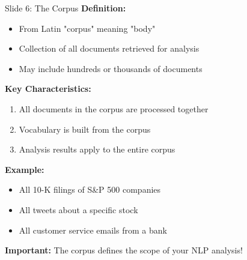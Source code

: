 \documentclass[8pt]{beamer}
\begin{document}
	\begin{frame}{Slide 6: The Corpus}
		\fontsize{6.5}{7.5}\selectfont
		\textbf{Definition:}
		\begin{itemize}
			\item From Latin "corpus" meaning "body"
			\item Collection of all documents retrieved for analysis
			\item May include hundreds or thousands of documents
		\end{itemize}
		
		\vspace{0.1cm}
		\textbf{Key Characteristics:}
		\begin{enumerate}
			\item All documents in the corpus are processed together
			\item Vocabulary is built from the corpus
			\item Analysis results apply to the entire corpus
		\end{enumerate}
		
		\vspace{0.1cm}
		\textbf{Example:}
		\begin{itemize}
			\item All 10-K filings of S\&P 500 companies
			\item All tweets about a specific stock
			\item All customer service emails from a bank
		\end{itemize}
		
		\textcolor{myblue}{\textbf{Important:}} The corpus defines the scope of your NLP analysis!
	\end{frame}
	
\end{document}
